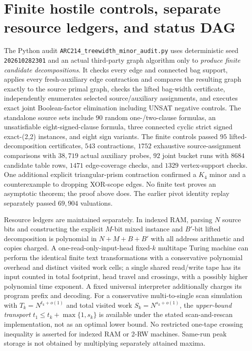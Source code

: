 \documentclass[11pt]{article}
\begin{document}
\section{Finite hostile controls, separate resource ledgers, and status DAG}
The Python audit \texttt{ARC214\_treewidth\_minor\_audit.py} uses deterministic seed \texttt{202610282301} and an actual third-party graph algorithm only to \emph{produce finite candidate decompositions}. It checks every edge and connected bag support, applies every fresh-auxiliary edge contraction and compares the resulting graph exactly to the source primal graph, checks the lifted bag-width certificate, independently enumerates selected source/auxiliary assignments, and executes exact joint Boolean-factor elimination including UNSAT negative controls. The standalone source sets include $90$ random one-/two-clause formulas, an unsatisfiable eight-signed-clause formula, three connected cyclic strict signed exact-(2,2) instances, and eight sign variants. The finite controls passed $95$ lifted-decomposition certificates, $543$ contractions, $1752$ exhaustive source-assignment comparisons with $38{,}719$ actual auxiliary probes, $92$ joint bucket runs with $8684$ candidate table rows, $1471$ edge-coverage checks, and $1329$ vertex-support checks. One additional explicit triangular-prism contraction confirmed a $K_4$ minor and a counterexample to dropping XOR-scope edges. No finite test proves an asymptotic theorem; the proof above does. The earlier pivot identity replay separately passed $69{,}904$ valuations.

Resource ledgers are maintained separately. In indexed RAM, parsing $N$ source bits and constructing the explicit $M$-bit mixed instance and $B'$-bit lifted decomposition is polynomial in $N+M+B+B'$ with all address arithmetic and copies charged. A one-read-only-input-head fixed-$k$ multitape Turing machine can perform the identical finite text transformations with a conservative polynomial overhead and distinct visited work cells; a single shared read/write tape has its input counted in total footprint, head travel and crossings, with a possibly higher polynomial time exponent. A fixed universal interpreter additionally charges its program prefix and decoding. For a conservative multi-to-single scan simulation with $T_k=N^{t_k+o(1)}$ and total visited work $S_k=N^{s_k+o(1)}$, the \emph{upper-bound transport} $t_1\le t_k+\max\{1,s_k\}$ is available under the stated scan-and-rescan implementation, not as an optimal lower bound. No restricted one-tape crossing inequality is asserted for indexed RAM or 2-RW machines. Same-run peak storage is not obtained by multiplying separately attained maxima.
\end{document}
